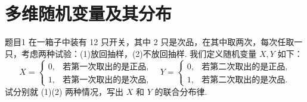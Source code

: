 \section{多维随机变量及其分布}

\begin{question}{题目1}
    在一箱子中装有 12 只开关，其中 2 只是次品，在其中取两次，每次任取一只，考虑两种试验：(1)放回抽样，(2)不放回抽样. 我们定义随机变量 $X,Y$ 如下：
    $$
        X = \begin{cases}
            0, & \text{若第一次取出的是正品}, \\
            1, & \text{若第一次取出的是次品},
        \end{cases}
        \quad
        Y = \begin{cases}
            0, & \text{若第二次取出的是正品}, \\
            1, & \text{若第二次取出的是次品}.
        \end{cases}
    $$
    试分别就 (1)(2) 两种情况，写出 $X$ 和 $Y$ 的联合分布律.
\end{question}
